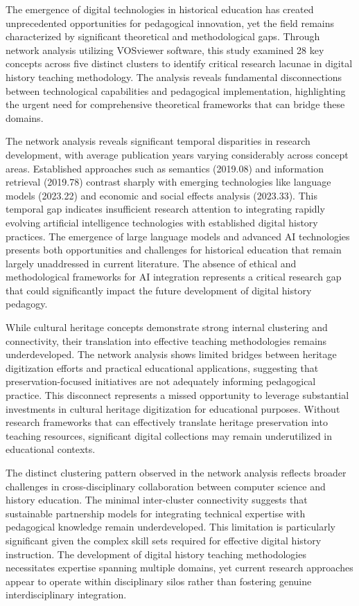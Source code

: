 The emergence of digital technologies in historical education has created unprecedented opportunities for pedagogical innovation, yet the field remains characterized by significant theoretical and methodological gaps. Through network analysis utilizing VOSviewer software, this study examined 28 key concepts across five distinct clusters to identify critical research lacunae in digital history teaching methodology. The analysis reveals fundamental disconnections between technological capabilities and pedagogical implementation, highlighting the urgent need for comprehensive theoretical frameworks that can bridge these domains.


The network analysis reveals significant temporal disparities in research development, with average publication years varying considerably across concept areas. Established approaches such as semantics (2019.08) and information retrieval (2019.78) contrast sharply with emerging technologies like language models (2023.22) and economic and social effects analysis (2023.33). This temporal gap indicates insufficient research attention to integrating rapidly evolving artificial intelligence technologies with established digital history practices.
The emergence of large language models and advanced AI technologies presents both opportunities and challenges for historical education that remain largely unaddressed in current literature. The absence of ethical and methodological frameworks for AI integration represents a critical research gap that could significantly impact the future development of digital history pedagogy.

While cultural heritage concepts demonstrate strong internal clustering and connectivity, their translation into effective teaching methodologies remains underdeveloped. The network analysis shows limited bridges between heritage digitization efforts and practical educational applications, suggesting that preservation-focused initiatives are not adequately informing pedagogical practice.
This disconnect represents a missed opportunity to leverage substantial investments in cultural heritage digitization for educational purposes. Without research frameworks that can effectively translate heritage preservation into teaching resources, significant digital collections may remain underutilized in educational contexts.

The distinct clustering pattern observed in the network analysis reflects broader challenges in cross-disciplinary collaboration between computer science and history education. The minimal inter-cluster connectivity suggests that sustainable partnership models for integrating technical expertise with pedagogical knowledge remain underdeveloped.
This limitation is particularly significant given the complex skill sets required for effective digital history instruction. The development of digital history teaching methodologies necessitates expertise spanning multiple domains, yet current research approaches appear to operate within disciplinary silos rather than fostering genuine interdisciplinary integration.

